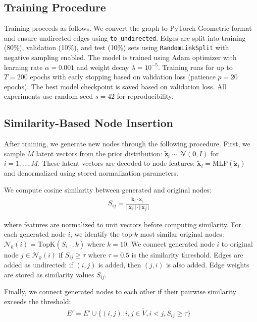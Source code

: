 \documentclass[12pt]{article}
\begin{document}
\subsection{Training Procedure}

Training proceeds as follows. We convert the graph to PyTorch Geometric format and ensure undirected edges using \texttt{to\_undirected}. Edges are split into training (80\%), validation (10\%), and test (10\%) sets using \texttt{RandomLinkSplit} with negative sampling enabled. The model is trained using Adam optimizer with learning rate $\alpha = 0.001$ and weight decay $\lambda = 10^{-5}$. Training runs for up to $T=200$ epochs with early stopping based on validation loss (patience $p=20$ epochs). The best model checkpoint is saved based on validation loss. All experiments use random seed $s=42$ for reproducibility.

\subsection{Similarity-Based Node Insertion}

After training, we generate new nodes through the following procedure. First, we sample $M$ latent vectors from the prior distribution: $\tilde{\mathbf{z}}_i \sim \mathcal{N}(0, I)$ for $i = 1, \ldots, M$. These latent vectors are decoded to node features: $\tilde{\mathbf{x}}_i = \text{MLP}(\tilde{\mathbf{z}}_i)$ and denormalized using stored normalization parameters.

We compute cosine similarity between generated and original nodes:
\begin{align}
S_{ij} = \frac{\tilde{\mathbf{x}}_i \cdot \mathbf{x}_j}{||\tilde{\mathbf{x}}_i|| \cdot ||\mathbf{x}_j||}
\end{align}

where features are normalized to unit vectors before computing similarity. For each generated node $i$, we identify the top-$k$ most similar original nodes: $\mathcal{N}_k(i) = \text{TopK}(S_{i,:}, k)$ where $k=10$. We connect generated node $i$ to original node $j \in \mathcal{N}_k(i)$ if $S_{ij} \geq \tau$ where $\tau = 0.5$ is the similarity threshold. Edges are added as undirected: if $(i, j)$ is added, then $(j, i)$ is also added. Edge weights are stored as similarity values $S_{ij}$.

Finally, we connect generated nodes to each other if their pairwise similarity exceeds the threshold:
\begin{align}
E' = E' \cup \{(i, j) : i, j \in \tilde{V}, i < j, S_{ij} \geq \tau\}
\end{align}
\end{document}
